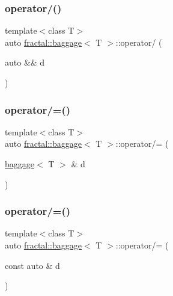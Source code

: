 \mbox{\label{classfractal_1_1baggage_adab2ca242795c9a158c4f5948c8e29bb}} 
\subsubsection{\texorpdfstring{operator/()}{operator/()}\hspace{0.1cm}{\footnotesize\ttfamily [3/3]}}
{\footnotesize\ttfamily template$<$class T$>$ \\
auto \hyperlink{classfractal_1_1baggage}{fractal\+::baggage}$<$ T $>$\+::operator/ (\begin{DoxyParamCaption}\item[{auto \&\&}]{d }\end{DoxyParamCaption})\hspace{0.3cm}{\ttfamily [inline]}}

\mbox{\label{classfractal_1_1baggage_a65c98b0f925e0c31d0d843a95aea5ffa}} 
\subsubsection{\texorpdfstring{operator/=()}{operator/=()}\hspace{0.1cm}{\footnotesize\ttfamily [1/3]}}
{\footnotesize\ttfamily template$<$class T$>$ \\
auto \hyperlink{classfractal_1_1baggage}{fractal\+::baggage}$<$ T $>$\+::operator/= (\begin{DoxyParamCaption}\item[{\hyperlink{classfractal_1_1baggage}{baggage}$<$ T $>$ \&}]{d }\end{DoxyParamCaption})\hspace{0.3cm}{\ttfamily [inline]}}

\mbox{\label{classfractal_1_1baggage_a94e6bca21db663f7fc5822e040ea122a}} 
\subsubsection{\texorpdfstring{operator/=()}{operator/=()}\hspace{0.1cm}{\footnotesize\ttfamily [2/3]}}
{\footnotesize\ttfamily template$<$class T$>$ \\
auto \hyperlink{classfractal_1_1baggage}{fractal\+::baggage}$<$ T $>$\+::operator/= (\begin{DoxyParamCaption}\item[{const auto \&}]{d }\end{DoxyParamCaption})\hspace{0.3cm}{\ttfamily [inline]}}

